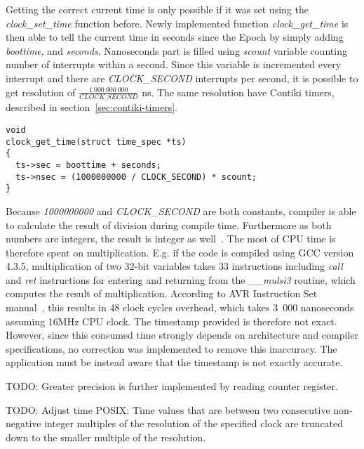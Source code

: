 Getting the correct current time is only possible if it was set using
the {\it{clock\_set\_time}} function before.
Newly implemented function {\it{clock\_get\_time}} is then able to tell the
current time in seconds since the Epoch by simply adding {\it{boottime}},
and {\it{seconds}}.
Nanoseconds part is filled using {\it{scount}} variable counting number of
interrupts within a second.
Since this variable is incremented every interrupt and there are {\it{CLOCK\_SECOND}} interrupts
per second, it is possible to get resolution of $\frac{1~000~000~000}{CLOCK\_SECOND}$ ns.
The same resolution have Contiki timers, described in section~\ref{sec:contiki-timers}.
\begin{lstlisting}
void
clock_get_time(struct time_spec *ts)
{
  ts->sec = boottime + seconds;
  ts->nsec = (1000000000 / CLOCK_SECOND) * scount;
}
\end{lstlisting}
Because {\it{1000000000}} and {\it{CLOCK\_SECOND}} are both constants, compiler is able to
calculate the result of division during compile time.
Furthermore as both numbers are integers, the result is integer as well~\cite{c99}.
The most of CPU time is therefore spent on multiplication.
E.g. if the code is compiled using GCC version 4.3.5,
multiplication of two 32-bit variables takes 33 instructions including {\it{call}} and {\it{ret}}
instructions for entering and returning from the {\it{\_\_mulsi3}} routine, which computes
the result of multiplication.
According to AVR Instruction Set manual~\cite{avr-instruction-set},
this results in 48 clock cycles overhead,
which takes 3~000 nanoseconds assuming 16MHz CPU clock.
The timestamp provided is therefore not exact.
However, since this consumed time strongly depends on architecture and compiler specifications,
no correction was implemented to remove this inaccuracy.
The application must be instead aware that the timestamp is not exactly accurate.

TODO: Greater precision is further implemented by reading counter register.

TODO: Adjust time
POSIX:
Time values that are between two consecutive non-negative integer multiples
of the resolution of the specified clock are truncated down to the smaller multiple of the resolution.
